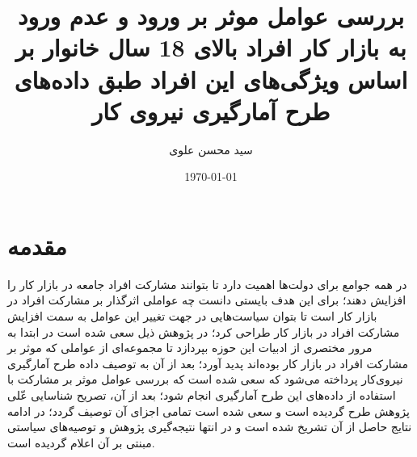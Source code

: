 \documentclass[12pt, a4paper]{article}
\begin{document}
	\title{بررسی عوامل موثر بر ورود و عدم ورود به بازار کار افراد بالای 18 سال خانوار بر اساس ویژگی‌های این افراد طبق
داده‌های طرح آمارگیری نیروی کار}
	\author{سید محسن علوی}
	\date{\today}
	\maketitle
\newpage
	\tableofcontents
\newpage
	\listoffigures
	\listoftables
	
\newpage

\section{مقدمه}
در همه جوامع برای دولت‌ها اهمیت دارد تا بتوانند مشارکت افراد جامعه در بازار کار را افزایش دهند؛ برای این هدف بایستی دانست چه عواملی اثرگذار بر مشارکت افراد در بازار کار است تا بتوان سیاست‌هایی در جهت تغییر این عوامل به سمت افزایش مشارکت افراد در بازار کار طراحی کرد؛ در پژوهش ذیل سعی شده است در ابتدا به مرور مختصری از ادبیات این حوزه بپردازد تا مجموعه‌‌ای از عواملی که موثر بر مشارکت افراد در بازار کار بوده‌اند پدید آورد؛ بعد از آن به توصیف داده‌ طرح آمارگیری نیروی‌کار پرداخته می‌شود که سعی شده است که بررسی عوامل موثر بر مشارکت با استفاده از داده‌های این طرح آمارگیری انجام شود؛ بعد از آن، تصریح شناسایی عّلی پژوهش طرح گردیده است و سعی شده است تمامی اجزای آن توصیف گردد؛ در ادامه نتایج حاصل از آن تشریخ شده است و در انتها نتیجه‌گیری پژوهش و توصیه‌های سیاستی مبنتی بر آن اعلام گردیده است.
\end{document}

